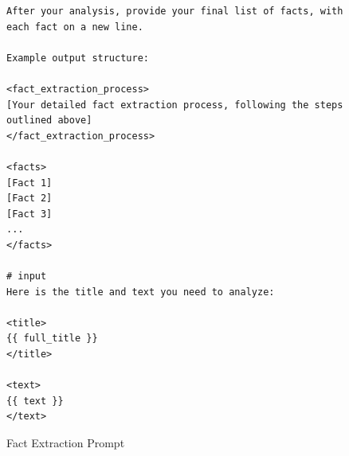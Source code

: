 \documentclass[11pt]{article}
\begin{document}
\begin{figure}[htb]
\begin{lstlisting}
After your analysis, provide your final list of facts, with each fact on a new line.

Example output structure:

<fact_extraction_process>
[Your detailed fact extraction process, following the steps outlined above]
</fact_extraction_process>

<facts>
[Fact 1]
[Fact 2]
[Fact 3]
...
</facts>

# input
Here is the title and text you need to analyze:

<title>
{{ full_title }}
</title>

<text>
{{ text }}
</text>
\end{lstlisting}

\caption{Fact Extraction Prompt}
\label{lst:claim_extraction}
\end{figure}
\end{document}
